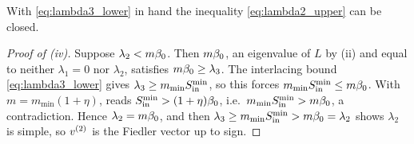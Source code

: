 \noindent With \eqref{eq:lambda3_lower} in hand the inequality
\eqref{eq:lambda2_upper} can be closed.

\begin{proof}[Proof of (iv)]
Suppose $\lambda_2<m\beta_0$. Then $m\beta_0$, an eigenvalue of $L$ by
(ii) and equal to neither $\lambda_1=0$ nor $\lambda_2$, satisfies
$m\beta_0\ge\lambda_3$. The interlacing bound \eqref{eq:lambda3_lower} gives
$\lambda_3\ge m_{\min}S_{\mathrm{in}}^{\min}$, so this forces $m_{\min}S_{\mathrm{in}}^{\min}\le m\beta_0$.
With $m=m_{\min}(1+\eta)$,  reads $S_{\mathrm{in}}^{\min}>(1+\eta)\beta_0$, i.e.\
$m_{\min}S_{\mathrm{in}}^{\min}>m\beta_0$, a contradiction. Hence $\lambda_2=m\beta_0$, and then
$\lambda_3\ge m_{\min}S_{\mathrm{in}}^{\min}>m\beta_0=\lambda_2$ shows $\lambda_2$ is simple, so
$v^{(2)}$ is the Fiedler vector up to sign.
\end{proof}
